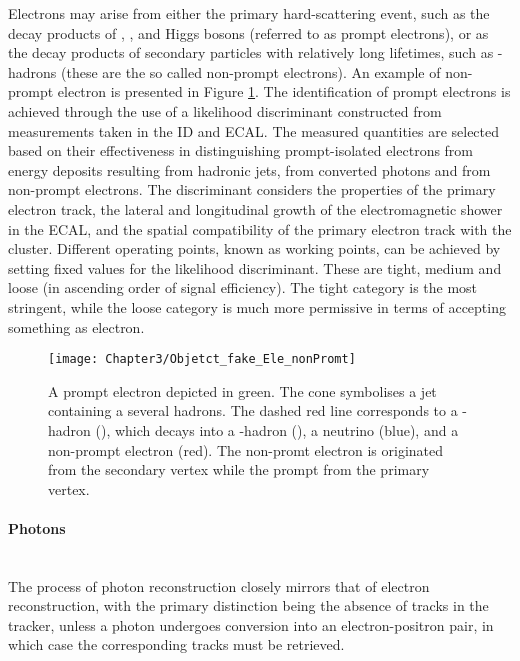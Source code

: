 Electrons may arise from either the primary hard-scattering event, such as the decay 
products of \PW, \PZ, and Higgs bosons (referred to as prompt electrons), or as the 
decay products of secondary particles with relatively long lifetimes, such as \Pbottom-hadrons 
(these are the so called non-prompt electrons). 
An example of non-prompt electron is presented in Figure \ref{fig:ChapReco:NonPromptElectron}. 
The identification of prompt electrons is achieved through the use of a likelihood discriminant 
constructed from measurements taken in the ID and ECAL. The measured quantities are selected 
based on their effectiveness in distinguishing prompt-isolated electrons from energy deposits 
resulting from hadronic jets, from converted photons and from non-prompt electrons. 
The discriminant considers the properties of the primary electron track, the lateral and longitudinal 
growth of the electromagnetic shower in the ECAL, and the spatial compatibility of the primary 
electron track with the cluster. 
Different operating points, known as working points, can be achieved by setting fixed values for the likelihood discriminant.
These are tight, medium and loose (in ascending order of signal efficiency). 
The tight category is the most stringent, while the loose category is much more permissive in
terms of accepting something as electron.
\begin{figure}
	\centering
 	\texttt{[image: Chapter3/Objetct\_fake\_Ele\_nonPromt]}
  	\caption{A prompt electron depicted in green. 
	The cone symbolises a jet containing a several hadrons.
	 The dashed red line corresponds to a \Pbottom-hadron (\PBminus),
	which decays into a \Pcharm-hadron (\APDzero), a neutrino (blue), and a non-prompt electron (red).
	The non-promt electron is originated from the secondary vertex while the prompt from the primary vertex.}
	 \label{fig:ChapReco:NonPromptElectron}
\end{figure}

\paragraph{Photons}\mbox{}\\
The process of photon reconstruction closely mirrors that of electron reconstruction, 
with the primary distinction being the absence of tracks in the tracker, 
unless a photon undergoes conversion into an electron-positron pair,
in which case the corresponding tracks must be retrieved.

